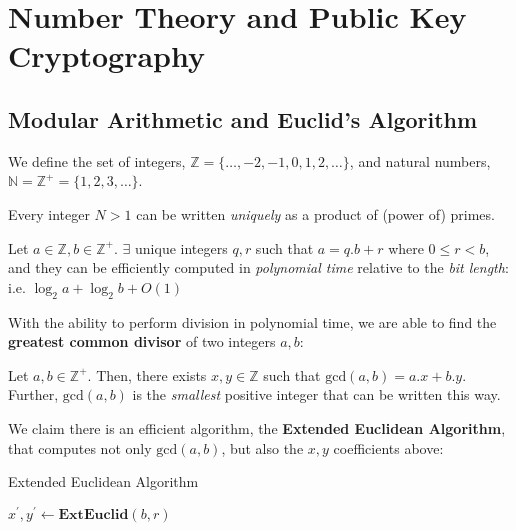 \setcounter{chapter}{3}
\setcounter{lecture}{18}
\chapter{Number Theory and Public Key Cryptography}
\section{Modular Arithmetic and Euclid's Algorithm}
We define the set of integers, \( \mathbb{Z} = \{ \ldots, -2, -1, 0, 1, 2, \ldots \} \), 
and natural numbers, \( \mathbb{N} = \mathbb{Z}^+ = \{ 1, 2, 3, \ldots \} \).

\begin{theorem}\label{ProductOfPrimes}
	Every integer \( N > 1 \) can be written \emph{uniquely} as
	a product of (power of) primes.
\end{theorem}

\begin{lemma}\label{DivisionWithRemainder}
	Let \( a \in \mathbb{Z}, b \in \mathbb{Z}^+ \). $\exists$ unique
	integers $q, r$ such that \( a = q . b + r \) where \( 0 \leq r < b \),    
	and they can be efficiently computed in \emph{polynomial time}
	relative to the \emph{bit length}: i.e. \( \log_2 a + \log_2 b + O(1) \) 
\end{lemma}

With the ability to perform division in polynomial time, we are able
to find the \textbf{greatest common divisor} of two integers $a, b$:

\begin{definition}\label{gcd}
	Let \( a, b \in \mathbb{Z}^+ \). Then, there exists \( x, y \in 
	\mathbb{Z} \) such that \( \text{gcd}(a, b) = a.x  + b.y \).   
	Further, \( \text{gcd}(a, b) \) is the \emph{smallest} positive integer
	that can be written this way. 
\end{definition}

We claim there is an efficient algorithm, the \textbf{Extended Euclidean Algorithm},
that computes not only \( \text{gcd}(a, b) \), but also the \( x, y \) coefficients above:

\begin{algorithm}[H]\label{eea}
	\DontPrintSemicolon
	\caption{Extended Euclidean Algorithm}
	\(x^{\prime}, y^{\prime} \gets \mathbf{ExtEuclid}(b, r) \)\; 
	\;
\end{algorithm}

